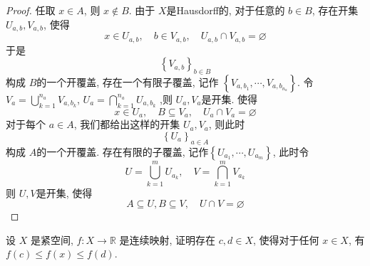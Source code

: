 \documentclass[../main.tex]{subfiles}
\begin{document}
\begin{proof}
   任取 \(  x \in A  \), 则 \(  x\not \in B  \). 由于 \(  X  \)是Hausdorff的, 对于任意的 \(  b\in B  \), 存在开集 \(  U_{a,b},V_{a,b}  \), 使得 \[
   x\in U_{a,b},\quad b \in V_{a,b},\quad U_{a,b}\cap V_{a,b}= \varnothing
   \]     于是 \[
   \left\{ V_{a,b} \right\}_{b\in B}
   \]构成 \(  B  \)的一个开覆盖, 存在一个有限子覆盖, 记作 \( \left\{  V_{a,b_1},\cdots ,V_{a,b_{n_{a}}} \right\}  \). 令 \(  V_{a}= \bigcup _{k= 1}^{n_{a}}V_{a,b_{k}}  \), \(  U_{a}= \bigcap _{k= 1}^{n_{a}}{U_{a,b_{k}}}  \) ,则 \(  U_{a}, V_{a}  \)是开集. 使得  \[
   x\in U_{a},\quad B\subseteq V_{a},\quad U_{a}\cap V_{a}= \varnothing
   \]   对于每个 \(  a \in A  \), 我们都给出这样的开集 \(  U_{a},V_{a}  \), 则此时 \[
   \left\{ U_{a} \right\}_{a \in A}
   \]  构成 \(  A  \)的一个开覆盖. 存在有限的子覆盖, 记作\(  \left\{ U_{a_1},\cdots ,U_{a_{m}} \right\}  \), 此时令 \[
   U= \bigcup _{k = 1}^{m}U_{a_{k}},\quad  V= \bigcap _{k = 1}^{m}V_{a_{k}}
   \]则 \(  U,V  \)是开集, 使得 \[
   A\subseteq U, B\subseteq V,\quad U\cap V= \varnothing
   \]   
\end{proof}
\begin{exercise}{}{}
    设 $X$ 是紧空间, $f : X \to \mathbb{R}$ 是连续映射, 证明存在 $c, d \in X$, 使得对于任何 $x \in X$, 有 $f(c) \le f(x) \le f(d)$.
\end{exercise}
\end{document}
